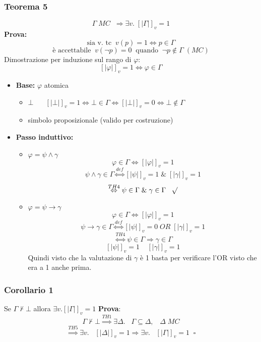\documentclass{article}
\theoremstyle{break}
\theoremstyle{break}
\theoremstyle{break}
\theoremstyle{break}
\begin{document}
\subsubsection{Teorema 5}
\[
  \Gamma\;MC\;\; \Rightarrow \exists v.\; [|\Gamma|]_v=1
\] 
\textbf{Prova:}
\[
\text{sia v. tc}\;\; v(p)=1 \Leftrightarrow p \in \Gamma
\] 
\[
\text{è accettabile}\;\;v(\neg p) = 0 \;\;\text{quando}\;\; \neg p \notin \Gamma\;(MC)
\] 
Dimostrazione per induzione sul rango di \( \varphi \):
\[
  [|\varphi|]_v = 1 \Leftrightarrow \varphi \in \Gamma
\] 
\begin{itemize}
  \item \textbf{Base:} \( \varphi \) atomica
   \begin{itemize}
     \item \( \bot\;\;\;\;\; \) 
       \(
         [|\bot|]_v = 1 \Leftrightarrow \bot \in \Gamma \Leftrightarrow [|\bot|]_v=0 \Leftrightarrow \bot \notin \Gamma
       \) 
     \item simbolo proposizionale (valido per costruzione)
   \end{itemize} 
  \item \textbf{Passo induttivo:} 
    \begin{itemize}
      \item \( \varphi = \psi \wedge \gamma\) 
        \[
          \varphi \in \Gamma \Leftrightarrow [|\varphi|]_v=1
        \] 
        \[
        \psi \wedge \gamma \in \Gamma \stackrel{def}{\Leftrightarrow} [|\psi|]_v=1\;\&\; [|\gamma|]_v=1
        \] 
        \[
          \stackrel{TH4}{\Leftrightarrow} \psi \in \Gamma\; \& \; \gamma \in \Gamma\;\;\; \surd
        \] 
      \item \( \varphi = \psi \to \gamma\)
        \[
        \varphi \in \Gamma \Leftrightarrow [|\varphi|]_v=1
        \] 
        \[
          \psi \to \gamma \in \Gamma \stackrel{def}{\Leftrightarrow} [|\psi|]_v=0 \; OR\; [|\gamma|]_v=1
        \] 
        \[
          \stackrel{TH4}{\Leftrightarrow} \psi \in \Gamma \Rightarrow \gamma \in \Gamma
        \] 
        \[
          [|\psi|]_v=1\;\;\;\;[|\gamma|]_v=1
        \] 
        Quindi visto che la valutazione di \( \gamma \) è 1 basta per verificare
        l'OR visto che era a 1 anche prima.
    \end{itemize}
\end{itemize}
\subsubsection{Corollario 1}
Se \( \Gamma \not\vdash \bot \) allora \( \exists v. [|\Gamma|]_v=1 \) 
\textbf{Prova}:
\[
  \Gamma \not\vdash \bot \stackrel{TH1}{\Rightarrow} \exists \Delta.\;\;\; \Gamma \subseteq \Delta,\;\;\; \Delta\; MC
\] 
\[
  \stackrel{TH5}{\Rightarrow} \exists v.\;\;\; [|\Delta|]_v=1 \Rightarrow \exists v.\;\;\; [|\Gamma|]_v=1 \;\; \square
\] 
\end{document}
